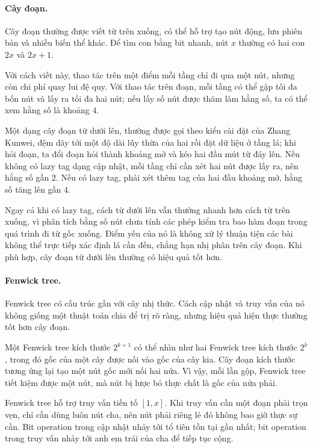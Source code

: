 \documentclass[11pt]{article}
\begin{document}
\paragraph{Cây đoạn.}
Cây đoạn thường được viết từ trên xuống, có thể hỗ trợ tạo nút động, lưu phiên
bản và nhiều biến thể khác. Để tìm con bằng bit nhanh, nút \(x\) thường có hai
con \(2x\) và \(2x+1\).

Với cách viết này, thao tác trên một điểm mỗi tầng chỉ đi qua một nút, nhưng
còn chi phí quay lui đệ quy. Với thao tác trên đoạn, mỗi tầng có thể gặp tối đa
bốn nút và lấy ra tối đa hai nút; nếu lấy số nút được thăm làm hằng số, ta có
thể xem hằng số là khoảng \(4\).

Một dạng cây đoạn từ dưới lên, thường được gọi theo kiểu cài đặt của Zhang
Kunwei, đệm dãy tới một độ dài lũy thừa của hai rồi đặt dữ liệu ở tầng lá; khi
hỏi đoạn, ta đổi đoạn hỏi thành khoảng mở và kéo hai đầu mút từ đáy lên. Nếu
không có lazy tag dạng cập nhật, mỗi tầng chỉ cần xét hai nút được lấy ra, nên
hằng số gần \(2\). Nếu có lazy tag, phải xét thêm tag của hai đầu khoảng mở, hằng
số tăng lên gần \(4\).

Ngay cả khi có lazy tag, cách từ dưới lên vẫn thường nhanh hơn cách từ trên
xuống, vì phân tích bằng số nút chưa tính các phép kiểm tra bao hàm đoạn trong
quá trình đi từ gốc xuống. Điểm yếu của nó là không xử lý thuận tiện các bài
không thể trực tiếp xác định lá cần đến, chẳng hạn nhị phân trên cây đoạn. Khi
phù hợp, cây đoạn từ dưới lên thường có hiệu quả tốt hơn.

\paragraph{Fenwick tree.}
Fenwick tree có cấu trúc gần với cây nhị thức. Cách cập nhật và truy vấn của nó
không giống một thuật toán chia để trị rõ ràng, nhưng hiệu quả hiện thực thường
tốt hơn cây đoạn.

Một Fenwick tree kích thước \(2^{k+1}\) có thể nhìn như hai Fenwick tree kích
thước \(2^k\), trong đó gốc của một cây được nối vào gốc của cây kia. Cây đoạn
kích thước tương ứng lại tạo một nút gốc mới nối hai nửa. Vì vậy, mỗi lần gộp,
Fenwick tree tiết kiệm được một nút, mà nút bị lược bỏ thực chất là gốc của nửa
phải.

Fenwick tree hỗ trợ truy vấn tiền tố \([1,x]\). Khi truy vấn cần một đoạn phải
trọn vẹn, chỉ cần dùng luôn nút cha, nên nút phải riêng lẻ đó không bao giờ
thực sự cần. Bit operation trong cập nhật nhảy tới tổ tiên tồn tại gần nhất;
bit operation trong truy vấn nhảy tới anh em trái của cha để tiếp tục cộng.
\end{document}
